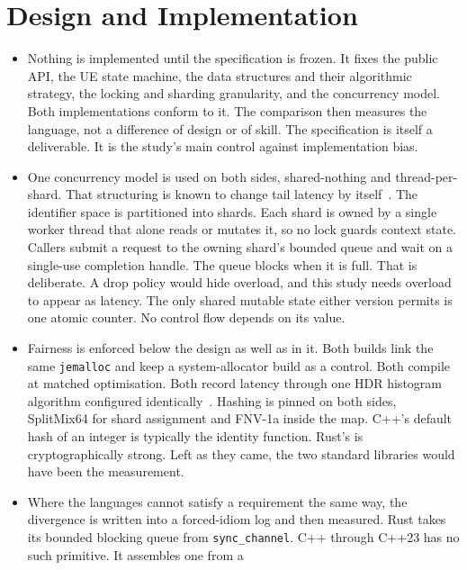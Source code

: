 \documentclass[english,twoside,openright,a4paper,censored,csm,software-track-2020]{HYthesisML}
\begin{document}
\chapter{Design and Implementation\label{chapter:design}}

\begin{itemize}
  \item Nothing is implemented until the specification is frozen. It fixes the public API, the
        UE state machine, the data structures and their algorithmic strategy, the locking and
        sharding granularity, and the concurrency model. Both implementations conform to it.
        The comparison then measures the language, not a difference of design or of skill. The
        specification is itself a deliverable. It is the study's main control against
        implementation bias.
  \item One concurrency model is used on both sides, shared-nothing and thread-per-shard.
        That structuring is known to change tail latency by
        itself~\cite{enberg2019threadpercore}. The identifier space is partitioned into shards.
        Each shard is owned by a single worker thread that alone reads or mutates it, so no lock
        guards context state. Callers submit a request to the owning shard's bounded queue and
        wait on a single-use completion handle. The queue blocks when it is full. That is
        deliberate. A drop policy would hide overload, and this study needs overload to appear as
        latency. The only shared mutable state either version permits is one atomic counter. No
        control flow depends on its value.
  \item Fairness is enforced below the design as well as in it. Both builds link the same
        \texttt{jemalloc} and keep a system-allocator build as a control. Both compile at
        matched optimisation. Both record latency through one HDR histogram algorithm configured
        identically~\cite{tene_hdrhistogram}. Hashing is pinned on both sides, SplitMix64 for
        shard assignment and FNV-1a inside the map. C++'s default hash of an integer is typically
        the identity function. Rust's is cryptographically strong. Left as they came, the two
        standard libraries would have been the measurement.
  \item Where the languages cannot satisfy a requirement the same way, the divergence is written
        into a forced-idiom log and then measured. Rust takes its bounded blocking queue from
        \texttt{sync\_channel}. C++ through C++23 has no such primitive. It assembles one from a

\end{itemize}
\end{document}

